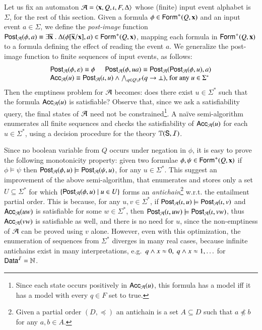 \documentclass[10pt]{llncs}
\begin{document}
Let us fix an automaton $\mathcal{A} = \left\langle \mathbf x,Q,\iota,F,\Delta \right\rangle$ whose
(finite) input event alphabet is $\Sigma$, for the rest of this
section. Given a formula $\phi \in \mathsf{Form}^+(Q,\mathbf x)$ and an input
event $a \in \Sigma$, we define the \emph{post-image} function
$\mathsf{Post}_{\mathcal{A}}(\phi,a) \equiv \exists \overline{\mathbf x} ~.~
\Delta(\phi[\overline{\mathbf x}/\mathbf x], a) \in \mathsf{Form}^+(Q,\mathbf x)$,
mapping each formula in $\mathsf{Form}^+(Q,\mathbf x)$ to a formula defining the
effect of reading the event $a$. We generalize the post-image function
to finite sequences of input events, as follows:
\[\begin{array}{l}
\mathsf{Post}_{\mathcal{A}}(\phi,\varepsilon) \equiv \phi \hspace*{5mm} \mathsf{Post}_{\mathcal{A}}(\phi,ua) \equiv \mathsf{Post}_{\mathcal{A}}(\mathsf{Post}_{\mathcal{A}}(\phi,u),a) \\
\mathsf{Acc}_{\mathcal{A}}(u) \equiv \mathsf{Post}_{\mathcal{A}}(\iota,u) \wedge \bigwedge_{q \in Q \setminus F} (q \rightarrow \bot)\text{, for any $u \in \Sigma^*$}
\end{array}\]
Then the emptiness problem for $\mathcal{A}$ becomes: does there exist $u \in
\Sigma^*$ such that the formula $\mathsf{Acc}_{\mathcal{A}}(u)$ is satisfiable?
Observe that, since we ask a satisfiability query, the final states of
$\mathcal{A}$ need not be constrained\footnote{ Since each state occurs
  positively in $\mathsf{Acc}_{\mathcal{A}}(u)$, this formula has a model iff it has
  a model with every $q \in F$ set to true.}. A na\"ive semi-algorithm
enumerates all finite sequences and checks the satisfiability of
$\mathsf{Acc}_{\mathcal{A}}(u)$ for each $u \in \Sigma^*$, using a decision procedure
for the theory $\mathbb{T}(\mathsf{S},\mathcal{I})$.

Since no boolean variable from $Q$ occurs under negation in $\phi$, it
is easy to prove the following monotonicity property: given two
formulae $\phi,\psi \in \mathsf{Form}^+(Q,\mathbf x)$ if $\phi \models \psi$
then $\mathsf{Post}_{\mathcal{A}}(\phi,u) \models \mathsf{Post}_{\mathcal{A}}(\psi,u)$, for any $u \in
\Sigma^*$. This suggest an improvement of the above semi-algorithm,
that enumerates and stores only a set $U \subseteq \Sigma^*$ for which
$\left\{ \mathsf{Post}_{\mathcal{A}}(\phi,u) \mid u \in U \right\}$ forms an
\emph{antichain}\footnote{Given a partial order $(D,\preceq)$ an
  antichain is a set $A \subseteq D$ such that $a \not\preceq b$ for
  any $a,b \in A$.} w.r.t. the entailment partial order. This is
because, for any $u,v \in \Sigma^*$, if $\mathsf{Post}_{\mathcal{A}}(\iota,u) \models
\mathsf{Post}_{\mathcal{A}}(\iota,v)$ and $\mathsf{Acc}_{\mathcal{A}}(uw)$ is satisfiable for some $w
\in \Sigma^*$, then $\mathsf{Post}_{\mathcal{A}}(\iota,uw) \models \mathsf{Post}_{\mathcal{A}}(\iota,vw)$,
thus $\mathsf{Acc}_{\mathcal{A}}(vw)$ is satisfiable as well, and there is no need
for $u$, since the non-emptiness of $\mathcal{A}$ can be proved using $v$
alone. However, even with this optimization, the enumeration of
sequences from $\Sigma^*$ diverges in many real cases, because
infinite antichains exist in many interpretations, e.g.\ $q \wedge x
\approx 0,~ q \wedge x \approx 1, \ldots$ for $\mathsf{Data}^{\mathcal{I}} = {\bf \mathbb{N}}$.
\end{document}

